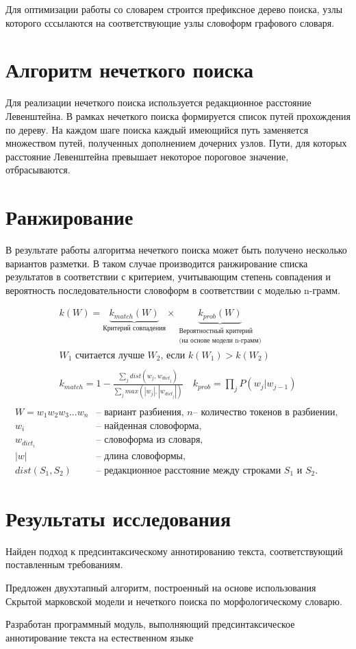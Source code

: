 \documentclass[14pt]{extarticle}
\begin{document}
Для оптимизации работы со словарем строится префиксное дерево поиска, узлы которого сссылаются на соответствующие узлы словоформ графового словаря.


\section{Алгоритм нечеткого поиска}
Для реализации нечеткого поиска используется редакционное расстояние Левенштейна.
В рамках нечеткого поиска формируется список путей прохождения по дереву. На каждом шаге поиска каждый имеющийся путь заменяется множеством путей, полученных дополнением дочерних узлов. Пути, для которых расстояние Левенштейна превышает некоторое пороговое значение, отбрасываются.

\section{Ранжирование}
В результате работы алгоритма нечеткого поиска может быть получено несколько вариантов разметки. В таком случае производится ранжирование списка результатов в соответствии с критерием, учитывающим степень совпадения и вероятность последовательности словоформ в соответствии с моделью n-грамм.

\begin{align*}
	k(W) = \underbrace{k_{match}(W)}_\text{Критерий совпадения} \times \underbrace{k_{prob}(W)}_{\substack{\text{Вероятностный критерий}\\\text{(на основе модели n-грамм)}}}\\
	\text{\(W_1\) считается лучше \(W_2\), если \(k(W_1) > k(W_2)\)}\\
	\\
    k_{match} = 1 - \frac{\displaystyle\sum_{j} dist(w_j,w_{dict_j}) }{\displaystyle\sum_{j} max(|w_j|,|w_{dict_j}|) } \quad k_{prob} = \prod_{j}P(w_j|w_{j-1})\\
\end{align*}
\begin{align*}
	W = w_1w_2w_3...w_n  &\text{-- вариант разбиения, } n\text{-- количество токенов в разбиении, } \\
	w_i &\text{-- найденная словоформа,} \\
	w_{dict_i} &\text{-- словоформа из словаря,} \\
	|w| &\text{-- длина словоформы,} \\
	dist(S_1, S_2) &\text{-- редакционное расстояние между строками } S_1 \text{ и } S_2.
\end{align*}


\section{Результаты исследования}

Найден подход к предсинтаксическому аннотированию текста, соответствующий поставленным требованиям.

Предложен двухэтапный алгоритм, построенный на основе использования Скрытой марковской модели и нечеткого поиска по морфологическому словарю.

Разработан программный модуль, выполняющий предсинтаксическое аннотирование текста на естественном языке
\end{document}
